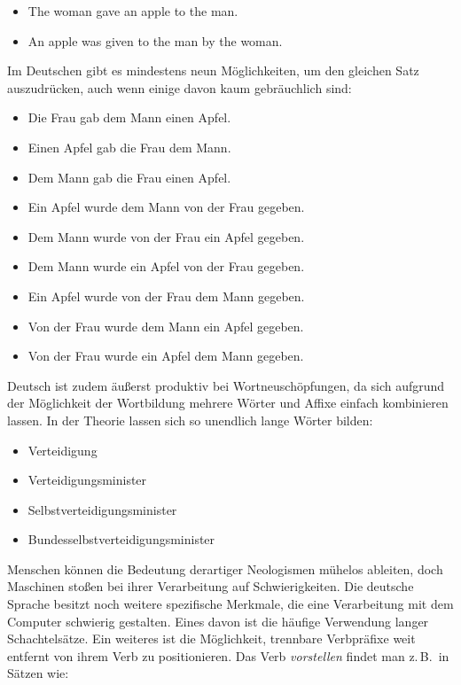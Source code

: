 \documentclass[]{../../metanetpaper}
\begin{document}
\begin{multicols}{2}
\begin{itemize}
\item The woman gave an apple to the man.
\item An apple was given to the man by the woman.
\end{itemize}

Im Deutschen gibt es mindestens neun Möglichkeiten, um den gleichen Satz auszudrücken, auch wenn einige davon kaum gebräuchlich sind:

\begin{itemize}
\item Die Frau gab dem Mann einen Apfel.
\item Einen Apfel gab die Frau dem Mann.
\item Dem Mann gab die Frau einen Apfel.
\item Ein Apfel wurde dem Mann von der Frau gegeben.
\item Dem Mann wurde von der Frau ein Apfel gegeben.
\item Dem Mann wurde ein Apfel von der Frau gegeben.
\item Ein Apfel wurde von der Frau dem Mann gegeben.
\item Von der Frau wurde dem Mann ein Apfel gegeben.
\item Von der Frau wurde ein Apfel dem Mann gegeben.
\end{itemize}  

Deutsch ist zudem äußerst produktiv bei Wortneuschöpfungen, da sich aufgrund der Möglichkeit der Wortbildung mehrere Wörter und Affixe einfach kombinieren lassen. In der Theorie lassen sich so unendlich lange Wörter bilden:

\begin{itemize} 
\item Verteidigung 
\item Verteidigungsminister 
\item Selbstverteidigungsminister 
\item Bundesselbstverteidigungsminister 
\end{itemize}
 
Menschen können die Bedeutung derartiger Neologismen mühelos ableiten, doch Maschinen stoßen bei ihrer Verarbeitung auf Schwierigkeiten. Die deutsche Sprache besitzt noch weitere spezifische Merkmale, die eine Verarbeitung mit dem Computer schwierig gestalten. Eines davon ist die häufige Verwendung langer Schachtelsätze. Ein weiteres ist die Möglichkeit, trennbare Verbpräfixe weit entfernt von ihrem Verb zu positionieren. Das Verb \textit{vorstellen} findet man z.\,B.~in Sätzen wie:


\end{multicols}
\end{document}

